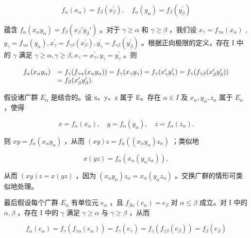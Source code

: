 \[
f _ {\alpha} (x _ {\alpha}) = f _ {\beta} (x _ {\beta} ^ {\prime}), \quad f _ {\alpha} (y _ {\alpha}) = f _ {\beta} (y _ {\beta} ^ {\prime})\tag{5}
\]

蕴含 \(f_{\alpha}(x_{\alpha}y_{\alpha}) = f_{\beta}(x_{\beta}'y_{\beta}')\) 。对于 \(\gamma \geqslant \alpha\) 和 \(\gamma \geqslant \beta\) ，我们设 \(x_{\gamma} = f_{\gamma \alpha}(x_{\alpha})\) , \(y_{\gamma} = f_{\gamma \alpha}(y_{\alpha}), x_{\gamma}^{\prime} = f_{\gamma \beta}(x_{\beta}^{\prime}), y_{\gamma}^{\prime} = f_{\gamma \beta}(y_{\beta}^{\prime})\) 。根据正向极限的定义，存在 I 中的 \(\gamma\) 满足 \(\gamma \geqslant \alpha, \gamma \geqslant \beta, x_{\gamma} = x_{\gamma}^{\prime}, y_{\gamma} = y_{\gamma}^{\prime}\) 。则

\[
\begin{array}{r l} f _ {\alpha} (x _ {\alpha} y _ {\alpha}) & = f _ {\gamma} (f _ {\gamma \alpha} (x _ {\alpha} y _ {\alpha})) = f _ {\gamma} (x _ {\gamma} y _ {\gamma}) = f _ {\gamma} (x _ {\gamma} ^ {\prime} y _ {\gamma} ^ {\prime}) = f _ {\gamma} (f _ {\gamma \beta} (x _ {\beta} ^ {\prime} y _ {\beta} ^ {\prime})) \\ & = f _ {\beta} (x _ {\beta} ^ {\prime} y _ {\beta} ^ {\prime}). \end{array}
\]

假设诸广群 \(E_{\alpha}\) 是结合的。设 x、y、z 属于 E。存在 \(\alpha \in I\) 及 \(x_{\alpha}, y_{\alpha}, z_{\alpha}\) 属于 \(E_{\alpha}\) ，使得

\[
x = f _ {\alpha} (x _ {\alpha}), \quad y = f _ {\alpha} (y _ {\alpha}), \quad z = f _ {\alpha} (z _ {\alpha}).
\]

则 \(xy = f_{\alpha}(x_{\alpha}y_{\alpha})\) ，从而 \((xy)z = f_{\alpha}((x_{\alpha}y_{\alpha})z_{\alpha})\) ；类似地

\[
x (y z) = f _ {\alpha} \left(x _ {\alpha} \left(y _ {\alpha} z _ {\alpha}\right)\right),
\]

从而 \((xy)z = x(yz)\) ，因为 \((x_{\alpha}y_{\alpha})z_{\alpha} = x_{\alpha}(y_{\alpha}z_{\alpha})\) 。交换广群的情形可类似地处理。

最后假设每个广群 \(E_{\alpha}\) 有单位元 \(e_{\alpha}\) ，且 \(f_{\beta\alpha}(e_{\alpha}) = e_{\beta}\) 对 \(\alpha \leqslant \beta\) 成立。对 I 中的 \(\alpha, \beta\) ，存在 I 中的 \(\gamma\) 满足 \(\gamma \geqslant \alpha\) 与 \(\gamma \geqslant \beta\) ，从而

\[
f _ {\alpha} (e _ {\alpha}) = f _ {\gamma} \left(f _ {\gamma \alpha} (e _ {\alpha})\right) = f _ {\gamma} (e _ {\gamma}) = f _ {\gamma} \left(f _ {\gamma \beta} (e _ {\beta})\right) = f _ {\beta} (e _ {\beta})
\]

